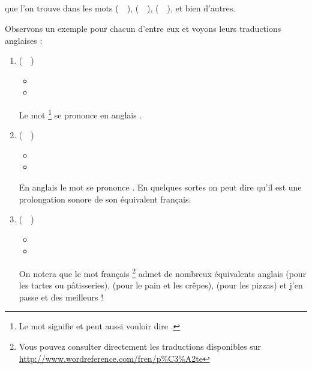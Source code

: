 \subsection{}\label{subsec:ɑ}

que l'on trouve dans les mots  (~~),
 (~~),  (~~), et bien d'autres.

Observons un exemple pour chacun d'entre eux et voyons leurs
traductions anglaises :\par

\begin{enumerate}
\item {} (~~)
  \begin{itemize}
  \item {}
    \item {}
    \end{itemize}
    Le mot \footnote{Le mot  signifie  et
      peut aussi vouloir dire .} se prononce en anglais \href{https://en.oxforddictionaries.com/definition/stick}{}.
\item {} (~~)
  \begin{itemize}
  \item {}
  \item {}
  \end{itemize}
  En anglais le mot  se prononce
  \href{https://en.oxforddictionaries.com/definition/mast}{}. En
  quelques sortes on peut dire qu'il est une prolongation sonore de son
  équivalent français.

  \item {} (~~)
    \begin{itemize}
    \item {}
    \item {}
    \end{itemize}
    On notera que le mot français \footnote{Vous pouvez consulter
      directement les traductions disponibles sur \url{http://www.wordreference.com/fren/p\%C3\%A2te}} admet de nombreux
    équivalents anglais  (pour les tartes ou
    pâtisseries),  (pour le pain et les crêpes),
     (pour les pizzas) et j'en passe et des meilleurs ! 
\end{enumerate}

